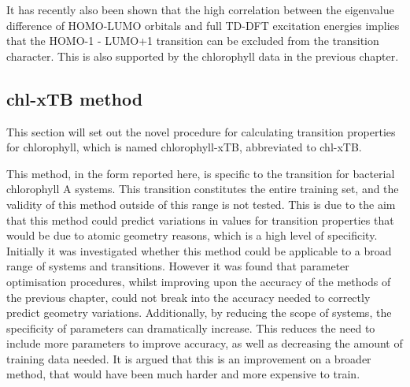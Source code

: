 \begin{figure}
\end{figure}

It has recently also been shown that the high correlation between the eigenvalue
difference of HOMO-LUMO orbitals and full TD-DFT excitation energies implies that
the HOMO-1 - LUMO+1 transition can be excluded from the transition character. This
is also supported by the chlorophyll data in the previous chapter.

\subsection{chl-xTB method}
\label{subsec:chl_method}
This section will set out the novel procedure for calculating transition properties
for chlorophyll, which is named chlorophyll-xTB, abbreviated to chl-xTB.

This method, in the form reported here, is specific to the \Qy transition for 
bacterial chlorophyll A systems. This transition constitutes the entire training
set, and the validity of this method outside of this range is not tested. This is
due to the aim that this method could predict variations in values for transition
properties that would be due to atomic geometry reasons, which is a high level of
specificity.
Initially it was investigated whether this method could be applicable to a broad
range of systems and transitions. However it was found that parameter optimisation
procedures, whilst improving upon the accuracy of the \dxtb methods of the previous
chapter, could not break into the accuracy needed to correctly predict geometry variations.
Additionally, by reducing the scope of systems, the specificity of parameters can
dramatically increase. This reduces the need to include more parameters to improve
accuracy, as well as decreasing the amount of training data needed. It is
argued that this is an improvement on a broader method, that would have been much
harder and more expensive to train.

